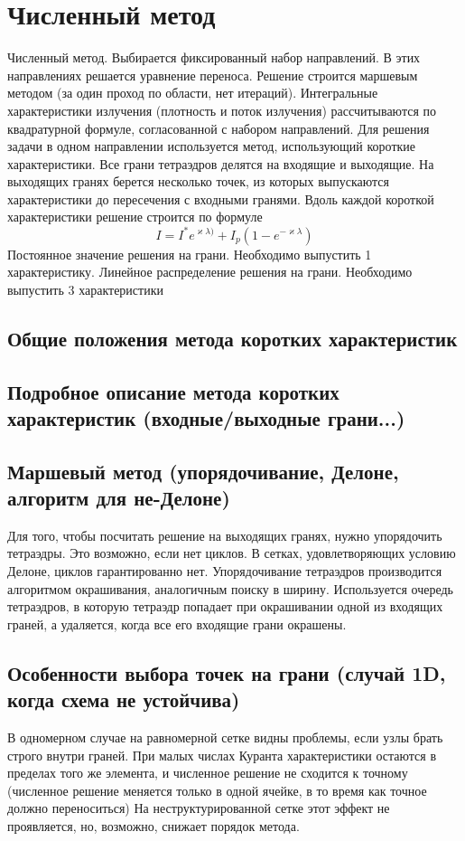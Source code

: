 \chapter{Численный метод}

Численный метод. Выбирается фиксированный набор направлений. В этих направлениях решается уравнение переноса. Решение строится маршевым методом (за один проход по области, нет итераций). Интегральные характеристики излучения (плотность и поток излучения) рассчитываются по квадратурной формуле, согласованной с набором направлений. Для решения задачи в одном направлении используется метод, использующий короткие характеристики. Все грани тетраэдров делятся на входящие и
выходящие. На выходящих гранях берется несколько точек, из которых выпускаются характеристики до пересечения с входными гранями. Вдоль каждой короткой характеристики решение строится по формуле 
\begin {equation}
I = I^*e^{\varkappa \lambda)} + I_p (1 - e^{-\varkappa \lambda})
\end {equation}
Постоянное значение решения на грани. Необходимо выпустить 1 характеристику. Линейное распределение решения на грани. Необходимо выпустить 3 характеристики

\section{Общие положения метода коротких характеристик}
\section{Подробное описание метода коротких характеристик (входные/выходные грани...)}
\section{Маршевый метод (упорядочивание, Делоне, алгоритм для не-Делоне)}
Для того, чтобы посчитать решение на выходящих гранях, нужно упорядочить тетраэдры. Это возможно, если нет циклов. В сетках, удовлетворяющих условию Делоне, циклов гарантированно нет. Упорядочивание тетраэдров производится алгоритмом окрашивания, аналогичным поиску в ширину. Используется очередь тетраэдров, в которую тетраэдр попадает при окрашивании одной из входящих граней, а удаляется, когда все его входящие грани окрашены.
\section{Особенности выбора точек на грани (случай 1D, когда схема не устойчива)}
В одномерном случае на равномерной сетке видны проблемы, если узлы брать строго внутри граней. При малых числах Куранта характеристики остаются в пределах того же элемента, и численное решение не сходится к точному (численное решение меняется только в одной ячейке, в то время как точное должно переноситься) На неструктурированной сетке этот эффект не проявляется, но, возможно, снижает порядок метода.
